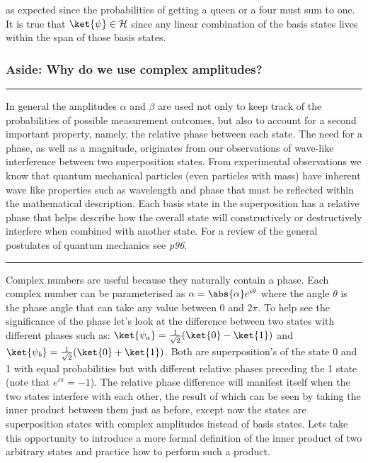 as expected since the probabilities of getting a queen or a four must sum to one. It is true that $\ket{\psi} \in \mathcal{H}$ since any linear combination of the basis states lives within the span of those basis states. 
\subsubsection{Aside: Why do we use complex amplitudes?}
\hrule
\vspace{\baselineskip}
In general the amplitudes $\alpha$ and $\beta$ are used not only to keep track of the probabilities of possible measurement outcomes, but also to account for a second important property, namely, the relative phase between each state. The need for a phase, as well as a magnitude, originates from our observations of wave-like interference between two superposition states. From experimental observations we know that quantum mechanical particles (even particles with mass) have inherent wave like properties such as wavelength and phase that must be reflected within the mathematical description. Each basis state in the superposition has a relative phase that helps describe how the overall state will constructively or destructively interfere when combined with another state. For a review of the general postulates of quantum mechanics see \cite{nielsen_chuang_2010} \textit{p96}.\\
\hrule
\vspace{\baselineskip}

Complex numbers are useful because they naturally contain a phase. Each complex number can be parameterised as $\alpha = \abs{\alpha}e^{i\theta}$ where the angle $\theta$ is the phase angle that can take any value between 0 and $2\pi$. To help see the significance of the phase let's look at the difference between two states with different phases such as: $\ket{\psi_{a}}=\frac{1}{\sqrt{2}}(\ket{0}-\ket{1})$ and $\ket{\psi_{b}}=\frac{1}{\sqrt{2}}(\ket{0}+\ket{1})$. Both are superposition's of the state 0 and 1 with equal probabilities but with different relative phases preceding the 1 state (note that $e^{i\pi}=-1$). The relative phase difference will manifest itself when the two states interfere with each other, the result of which can be seen by taking the inner product between them just as before, except now the states are superposition states with complex amplitudes instead of basis states. Lets take this opportunity to introduce a more formal definition of the inner product of two arbitrary states and practice how to perform such a product.\\

